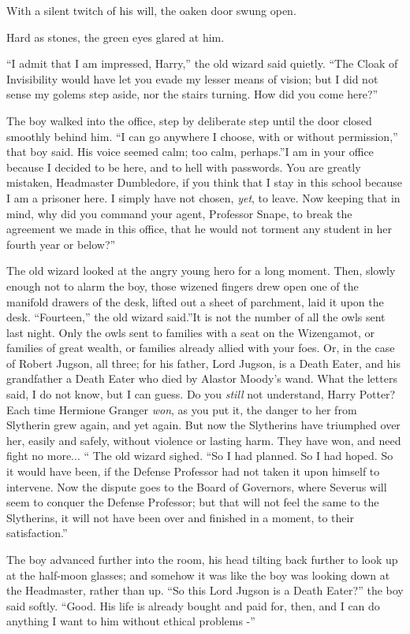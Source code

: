 With a silent twitch of his will, the oaken door swung open.

Hard as stones, the green eyes glared at him.

``I admit that I am impressed, Harry,'' the old wizard said quietly.
``The Cloak of Invisibility would have let you evade my lesser means of
vision; but I did not sense my golems step aside, nor the stairs
turning. How did you come here?''

The boy walked into the office, step by deliberate step until the door
closed smoothly behind him. ``I can go anywhere I choose, with or
without permission,'' that boy said. His voice seemed calm; too calm,
perhaps.''I am in your office because I decided to be here, and to hell
with passwords. You are greatly mistaken, Headmaster Dumbledore, if you
think that I stay in this school because I am a prisoner here. I simply
have not chosen, \emph{yet}, to leave. Now keeping that in mind, why did
you command your agent, Professor Snape, to break the agreement we made
in this office, that he would not torment any student in her fourth year
or below?''

The old wizard looked at the angry young hero for a long moment. Then,
slowly enough not to alarm the boy, those wizened fingers drew open one
of the manifold drawers of the desk, lifted out a sheet of parchment,
laid it upon the desk. ``Fourteen,'' the old wizard said.''It is not the
number of all the owls sent last night. Only the owls sent to families
with a seat on the Wizengamot, or families of great wealth, or families
already allied with your foes. Or, in the case of Robert Jugson, all
three; for his father, Lord Jugson, is a Death Eater, and his
grandfather a Death Eater who died by Alastor Moody's wand. What the
letters said, I do not know, but I can guess. Do you \emph{still} not
understand, Harry Potter? Each time Hermione Granger \emph{won}, as you
put it, the danger to her from Slytherin grew again, and yet again. But
now the Slytherins have triumphed over her, easily and safely, without
violence or lasting harm. They have won, and need fight no more...
`` The old wizard sighed. ``So I had planned. So I had hoped. So it would
have been, if the Defense Professor had not taken it upon himself to
intervene. Now the dispute goes to the Board of Governors, where Severus
will seem to conquer the Defense Professor; but that will not feel the
same to the Slytherins, it will not have been over and finished in a
moment, to their satisfaction.''

The boy advanced further into the room, his head tilting back further to
look up at the half-moon glasses; and somehow it was like the boy was
looking down at the Headmaster, rather than up. ``So this Lord Jugson is
a Death Eater?'' the boy said softly. ``Good. His life is already bought
and paid for, then, and I can do anything I want to him without ethical
problems -''

